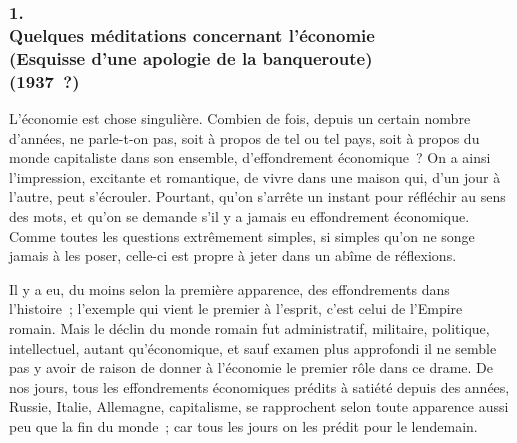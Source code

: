 \documentclass[french,twoside]{book} %
\begin{document}
\subsubsection[1. Quelques méditations concernant l’économie, (Esquisse d'une apologie de la banqueroute) (1937 ?)]{1. \\
Quelques méditations concernant l’économie \\
(Esquisse d'une apologie de la banqueroute) \\
(1937 ?)}
\noindent \par
L'économie est chose singulière. Combien de fois, depuis un certain nombre d'années, ne parle-t-on pas, soit à propos de tel ou tel pays, soit à propos du monde capitaliste dans son ensemble, d'effondrement économique ? On a ainsi l'impression, excitante et romantique, de vivre dans une maison qui, d'un jour à l'autre, peut s'écrouler. Pourtant, qu'on s'arrête un instant pour réfléchir au sens des mots, et qu'on se demande s'il y a jamais eu effondrement économique. Comme toutes les questions extrêmement simples, si simples qu'on ne songe jamais à les poser, celle-ci est propre à jeter dans un abîme de réflexions.\par
Il y a eu, du moins selon la première apparence, des effondrements dans l'histoire ; l'exemple qui vient le premier à l'esprit, c'est celui de l'Empire romain. Mais le déclin du monde romain fut administratif, militaire, politique, intellectuel, autant qu'économique, et sauf examen plus approfondi il ne semble pas y avoir de raison de donner à l'économie le premier rôle dans ce drame. De nos jours, tous les effondrements économiques prédits à satiété depuis des années, Russie, Italie, Allemagne, capitalisme, se rapprochent selon toute apparence aussi peu que la fin du monde ; car tous les jours on les prédit pour le lendemain.\par
\end{document}
